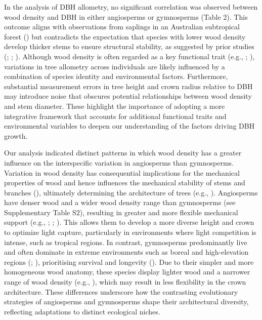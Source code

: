 \documentclass[
  12pt,
  letterpaper,
  DIV=11,
  numbers=noendperiod]{scrartcl}
\begin{document}
In the analysis of DBH allometry, no significant correlation was
observed between wood density and DBH in either angiosperms or
gymnosperms (Table 2). This outcome aligns with observations from
saplings in an Australian subtropical forest
() but contradicts
the expectation that species with lower wood density develop thicker
stems to ensure structural stability, as suggested by prior studies
(;
;
). Although wood density is
often regarded as a key functional trait (e.g.,
;
), variations in tree
allometry across individuals are likely influenced by a combination of
species identity and environmental factors. Furthermore, substantial
measurement errors in tree height and crown radius relative to DBH may
introduce noise that obscures potential relationships between wood
density and stem diameter. These highlight the importance of adopting a
more integrative framework that accounts for additional functional
traits and environmental variables to deepen our understanding of the
factors driving DBH growth.

Our analysis indicated distinct patterns in which wood density has a
greater influence on the interspecific variation in angiosperms than
gymnosperms. Variation in wood density has consequential implications
for the mechanical properties of wood and hence influences the
mechanical stability of stems and branches
(), ultimately
determining the architecture of trees (e.g.,
). Angiosperms have
denser wood and a wider wood density range than gymnosperms (see
Supplementary Table S2), resulting in greater and more flexible
mechanical support (e.g., ;
;
). This allows them to develop a
more diverse height and crown to optimize light capture, particularly in
environments where light competition is intense, such as tropical
regions. In contrast, gymnosperms predominantly live and often dominate
in extreme environments such as boreal and high-elevation regions
(;
), prioritising survival and
longevity (). Due to
their simpler and more homogeneous wood anatomy, these species display
lighter wood and a narrower range of wood density (e.g.,
), which may result in less
flexibility in the crown architecture. These differences underscore how
the contrasting evolutionary strategies of angiosperms and gymnosperms
shape their architectural diversity, reflecting adaptations to distinct
ecological niches.
\end{document}
